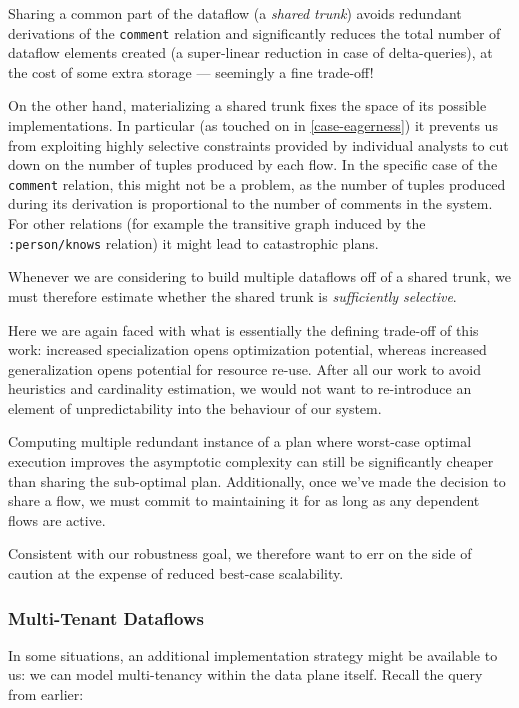 \documentclass[../catalog.tex]{subfiles}
\begin{document}
Sharing a common part of the dataflow (a \emph{shared trunk}) avoids
redundant derivations of the \texttt{comment} relation and
significantly reduces the total number of dataflow elements created (a
super-linear reduction in case of delta-queries), at the cost of some
extra storage — seemingly a fine trade-off!

On the other hand, materializing a shared trunk fixes the space of its
possible implementations. In particular (as touched on in
\ref{case-eagerness}) it prevents us from exploiting highly selective
constraints provided by individual analysts to cut down on the number
of tuples produced by each flow. In the specific case of the
\texttt{comment} relation, this might not be a problem, as the number
of tuples produced during its derivation is proportional to the number
of comments in the system. For other relations (for example the
transitive graph induced by the \texttt{:person/knows} relation) it
might lead to catastrophic plans.

Whenever we are considering to build multiple dataflows off of a
shared trunk, we must therefore estimate whether the shared trunk is
\emph{sufficiently selective}.

Here we are again faced with what is essentially the defining
trade-off of this work: increased specialization opens optimization
potential, whereas increased generalization opens potential for
resource re-use. After all our work to avoid heuristics and
cardinality estimation, we would not want to re-introduce an element
of unpredictability into the behaviour of our system.

Computing multiple redundant instance of a plan where worst-case
optimal execution improves the asymptotic complexity can still be
significantly cheaper than sharing the sub-optimal plan. Additionally,
once we've made the decision to share a flow, we must commit to
maintaining it for as long as any dependent flows are active.

Consistent with our robustness goal, we therefore want to err on the
side of caution at the expense of reduced best-case
scalability.

\subsubsection{Multi-Tenant Dataflows}

In some situations, an additional implementation strategy might be
available to us: we can model multi-tenancy within the data plane
itself. Recall the query from earlier:
\end{document}
